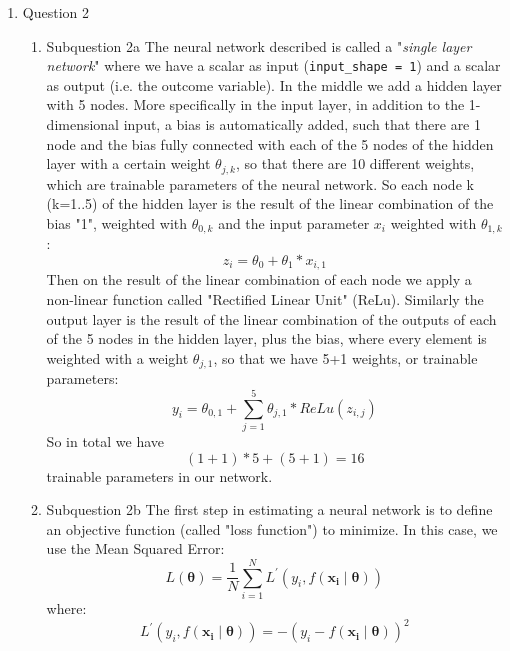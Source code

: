 \documentclass[12pt,twoside]{article}
\begin{document}
\begin{enumerate}
\begin{enumerate}
\end{enumerate}

\item Question 2

\begin{enumerate}
	\item Subquestion 2a
	The neural network described is called a "\textit{single layer network}" where we have a scalar as input (\texttt{input\_shape = 1}) and a scalar as output (i.e. the outcome variable). In the middle we add a hidden layer with 5 nodes.
	More specifically in the input layer, in addition to the 1-dimensional input, a bias is automatically added, such that there are 1 node and the bias fully connected with each of the 5 nodes of the hidden layer with a certain weight $\theta_{j,k}$, so that there are 10 different weights, which are trainable parameters of the neural network.
	So each node k (k=1..5) of the hidden layer is the result of the linear combination of the bias "1", weighted with $\theta_{0,k}$ and the input parameter $x_{i}$ weighted with  $\theta_{1,k}$:
	\begin{equation}
		z_i=\theta_0+\theta_1 * x_{i, 1}
	\end{equation}
	Then on the result of the linear combination of each node we apply a non-linear function called "Rectified Linear Unit" (ReLu).
	Similarly the output layer is the result of the linear combination of the outputs of each of the 5 nodes in the hidden layer, plus the bias, where every element is weighted with a weight $\theta_{j,1}$, so that we have 5+1 weights, or trainable parameters:
	\begin{equation}
		y_i=\theta_{0,1}+\sum_{j=1}^5 \theta_{j,1}* ReLu(z_{i, j})
	\end{equation}
	So in total we have $$(1+1)*5 + (5+1)=16$$ trainable parameters in our network.
	\item Subquestion 2b 
	The first step in estimating a neural network is to define an objective function (called "loss function") to minimize. In this case, we use the Mean Squared Error:
	\begin{equation}
		L(\boldsymbol{\theta})=\frac{1}{N} \sum_{i=1}^N L^{\prime}\left(y_i, f\left(\mathbf{x}_{\mathbf{i}} \mid \boldsymbol{\theta}\right)\right)
	\end{equation}
	where:
	\begin{equation}
		L^{\prime}\left(y_i, f\left(\mathbf{x}_{\mathbf{i}} \mid \boldsymbol{\theta}\right)\right)=-(y_i - f\left(\mathbf{x}_{\mathbf{i}} \mid \boldsymbol{\theta}\right))^2
	\end{equation}

\end{enumerate}
\end{enumerate}
\end{document}
